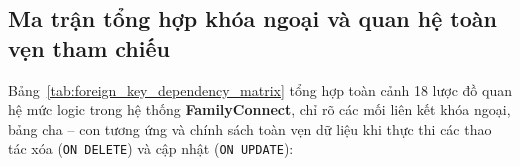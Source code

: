 \subsection{Ma trận tổng hợp khóa ngoại và quan hệ toàn vẹn tham chiếu}
\label{subsec:ma_tran_khoa_ngoai}

Bảng~\ref{tab:foreign_key_dependency_matrix} tổng hợp toàn cảnh 18 lược đồ quan hệ mức logic trong hệ thống \textbf{FamilyConnect}, chỉ rõ các mối liên kết khóa ngoại, bảng cha -- con tương ứng và chính sách toàn vẹn dữ liệu khi thực thi các thao tác xóa (\texttt{ON DELETE}) và cập nhật (\texttt{ON UPDATE}):

